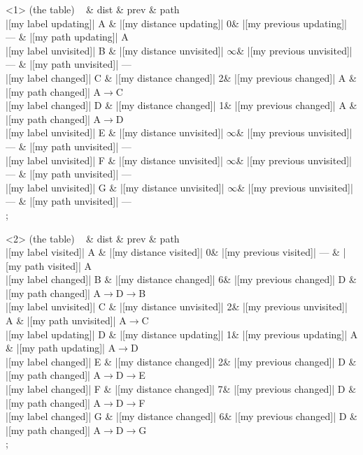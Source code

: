 


\begin{visibleenv}<1>
 (the table) {
~ \& dist \& prev \& path \\
|[my label updating]| A \& |[my distance updating]| 0\& |[my previous updating]| --- \& |[my path updating]| A\\
|[my label unvisited]| B \& |[my distance unvisited]| $\infty$\& |[my previous unvisited]| --- \& |[my path unvisited]| ---\\
|[my label changed]| C \& |[my distance changed]| 2\& |[my previous changed]| A \& |[my path changed]| A$\rightarrow$C\\
|[my label changed]| D \& |[my distance changed]| 1\& |[my previous changed]| A \& |[my path changed]| A$\rightarrow$D\\
|[my label unvisited]| E \& |[my distance unvisited]| $\infty$\& |[my previous unvisited]| --- \& |[my path unvisited]| ---\\
|[my label unvisited]| F \& |[my distance unvisited]| $\infty$\& |[my previous unvisited]| --- \& |[my path unvisited]| ---\\
|[my label unvisited]| G \& |[my distance unvisited]| $\infty$\& |[my previous unvisited]| --- \& |[my path unvisited]| ---\\
};
\end{visibleenv}
            
\begin{visibleenv}<2>
 (the table) {
~ \& dist \& prev \& path \\
|[my label visited]| A \& |[my distance visited]| 0\& |[my previous visited]| --- \& |[my path visited]| A\\
|[my label changed]| B \& |[my distance changed]| 6\& |[my previous changed]| D \& |[my path changed]| A$\rightarrow$D$\rightarrow$B\\
|[my label unvisited]| C \& |[my distance unvisited]| 2\& |[my previous unvisited]| A \& |[my path unvisited]| A$\rightarrow$C\\
|[my label updating]| D \& |[my distance updating]| 1\& |[my previous updating]| A \& |[my path updating]| A$\rightarrow$D\\
|[my label changed]| E \& |[my distance changed]| 2\& |[my previous changed]| D \& |[my path changed]| A$\rightarrow$D$\rightarrow$E\\
|[my label changed]| F \& |[my distance changed]| 7\& |[my previous changed]| D \& |[my path changed]| A$\rightarrow$D$\rightarrow$F\\
|[my label changed]| G \& |[my distance changed]| 6\& |[my previous changed]| D \& |[my path changed]| A$\rightarrow$D$\rightarrow$G\\
};
\end{visibleenv}
            
